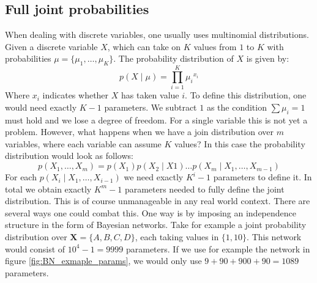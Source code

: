 \subsection{Full joint probabilities}
When dealing with discrete variables, one usually uses multinomial 
distributions. Given a discrete variable $X$, which can take on
$K$ values from $1$ to $K$ with probabilities 
$\mu = \{\mu_1, \dots, \mu_K\}$. The probability 
distribution of $X$ is given by:
\begin{equation}
p(X \mid \mu) = \prod_{i=1}^{K} {\mu_i}^{x_i}
\end{equation}
Where $x_i$ indicates whether $X$ has taken value $i$. To define
this distribution, one would need exactly $K - 1$ parameters. We
subtract $1$ as the condition $\sum \mu_i = 1$ must hold and we
lose a degree of freedom. For a single variable this is not yet a
problem. However, what happens when we have a join distribution over
$m$ variables, where each variable can assume $K$ values?
In this case the probability distribution would look as follows:
\begin{equation}
p(X_1, \dots, X_m) = p(X_1)p(X_2 \mid X1)\dots p(X_m \mid X_1, \dots, X_{m-1})
\end{equation}
For each $p(X_i \mid X_1, \dots, X_{i-1})$ we need exactly $K^i - 1$
parameters to define it. In total we obtain exactly $K^m - 1$ parameters
needed to fully define the joint distribution. This is of course
unmanageable in any real world context. There are several ways 
one could combat this. One way is by imposing an independence structure
in the form of Bayesian networks. Take for example a joint probability
distribution over $\textbf{X} = \{A, B, C, D\}$, each taking values in
$\{1, 10\}$. This network would consist of $10^{4} - 1 = 9999$ 
parameters. If we use for example the network in figure
\ref{fig:BN_exmaple_params}, we would only use $9 + 90 + 900 + 90 
= 1089$ 
parameters.
